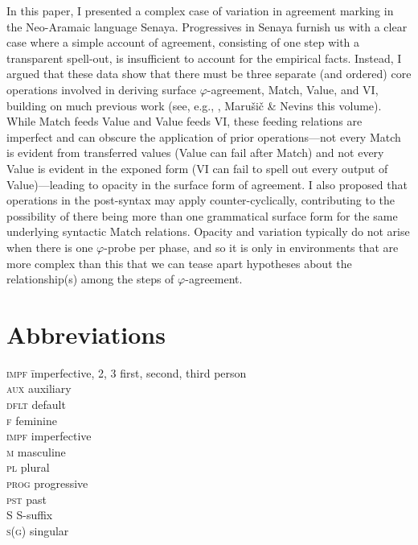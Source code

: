 \documentclass[output=paper
,modfonts
,nonflat]{langsci/langscibook}
\begin{document}
In this paper, I presented a complex case of variation in agreement marking in the Neo-Aramaic language Senaya. Progressives in Senaya furnish us with a clear case where a simple account of agreement, consisting of one step with a transparent spell-out, is insufficient to account for the empirical facts. Instead, I argued that these data show that there must be three separate (and ordered) core operations involved in deriving surface $\varphi$-agreement, Match, Value, and VI, building on much previous work (see, e.g., \citealt{vanKoppen07,BBP09,ArregiNevins12,BhattWalkow13,Bonet13,Marusicetal15, Smith17, AtlamazBakerTA}, Marušič \& Nevins this volume). While Match feeds Value and Value feeds VI, these feeding relations are imperfect and can obscure the application of prior operations---not every Match is evident from transferred values (Value can fail after Match) and not every Value is evident in the exponed form (VI can fail to spell out every output of Value)---leading to opacity in the surface form of agreement. I also proposed that operations in the post-syntax may apply counter-cyclically, contributing to the possibility of there being more than one grammatical surface form for the same underlying syntactic Match relations. Opacity and variation typically do not arise when there is one $\varphi$-probe per phase, and so it is only in environments that are more complex than this that we can tease apart hypotheses about the relationship(s) among the steps of $\varphi$-agreement.

\section*{Abbreviations}

\begin{multicols}{2}
	\begin{tabbing}
		\textsc{impf}\hspace{5mm} \= imperfective, 2, 3 \> first, second, third person\\
\textsc{aux} \> auxiliary\\
\textsc{dflt} \> default\\
 \textsc{f} \> feminine\\
\textsc{impf} \> imperfective\\
 \textsc{m} \> masculine\\
 \textsc{pl} \> plural\\
 \textsc{prog} \> progressive\\
 \textsc{pst} \> past\\
 S \> S-suffix\\
 \textsc{s(g)} \> singular\\
	\end{tabbing} 
\end{multicols}
\end{document}
